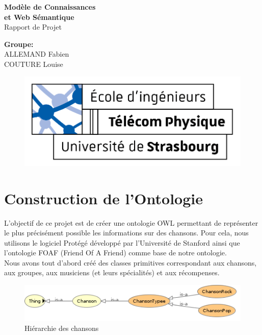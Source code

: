 \documentclass{article}
\begin{document}
\thispagestyle{empty}
\addtocounter{page}{-1}
\begin{center}
	\baselineskip=50pt
	\vspace*{1cm}
	\textbf{{\Huge Modèle de Connaissances\\et Web Sémantique}}\\
	\vspace*{0.25cm}
	\textsf{{\Huge Rapport de Projet}}\\
	\vspace*{0.25cm}
	\begin{minipage}[c]{.46\linewidth}
        \centering
        \textbf{Groupe:}\\
		ALLEMAND Fabien\\
        COUTURE Louise
    \end{minipage}
\end{center}
\vspace{0.1cm}

\begin{figure}[H]
\centering
\centerline{\includegraphics[scale=2]{img/logo_TPS_2.png}}
\end{figure}

\newpage

\section{Construction de l'Ontologie}

L'objectif de ce projet est de créer une ontologie OWL permettant de représenter le plus précisément possible les informations sur des chansons. Pour cela, nous utilisons le logiciel Protégé développé par l'Université de Stanford ainsi que l'ontologie FOAF (Friend Of A Friend) comme base de notre ontologie.\\
Nous avons tout d'abord créé des classes primitives correspondant aux chansons, aux groupes, aux musiciens (et leurs spécialités) et aux récompenses. 

\begin{figure}[H]
    \center
    \includegraphics[scale=.5]{img/chanson.png}
    \caption{Hiérarchie des chansons}
\end{figure}
\end{document}
